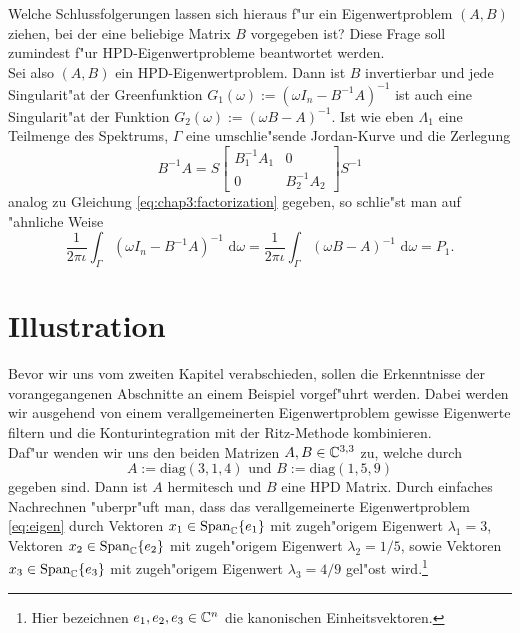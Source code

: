 Welche Schlussfolgerungen lassen sich hieraus f"ur ein Eigenwertproblem $(A,B)$ ziehen, bei der eine beliebige Matrix $B$ vorgegeben ist? Diese Frage soll zumindest f"ur HPD-Eigenwertprobleme beantwortet werden.\\

Sei also $(A,B)$ ein HPD-Eigenwertproblem. Dann ist $B$ invertierbar und jede Singularit"at der Greenfunktion $G_1(\omega) := (\omega I_n - B^{-1}A)^{-1}$
ist auch eine Singularit"at der Funktion $G_2(\omega):=(\omega B - A)^{-1}$. Ist wie eben $\Lambda_1$ eine Teilmenge des Spektrums, $\Gamma$ eine umschlie"sende Jordan-Kurve und die Zerlegung
\[
B^{-1}A = S\begin{bmatrix} B^{-1}_1 A_1 & 0 \\ 0 & B^{-1}_2 A_2 \end{bmatrix} S^{-1}
\]
analog zu Gleichung \ref{eq:chap3:factorization} gegeben, so schlie"st man auf "ahnliche Weise
\[
\frac{1}{2\pi\iota}\int_\Gamma (\omega I_n - B^{-1}A)^{-1} \text{ d}\omega =
\frac{1}{2\pi\iota}\int_\Gamma (\omega B - A)^{-1} \text{ d}\omega
= P_1.
\]

\section{Illustration}\label{sec:bsp}

Bevor wir uns vom zweiten Kapitel verabschieden, sollen die Erkenntnisse der vorangegangenen
Abschnitte an einem Beispiel vorgef"uhrt werden. Dabei werden wir ausgehend von einem
verallgemeinerten Eigenwertproblem gewisse Eigenwerte filtern und die Konturintegration
mit der Ritz-Methode kombinieren.\\

Daf"ur wenden wir uns den beiden Matrizen
$A,B \in \mathbb{C}^{3,3}$ zu, welche durch
\[
A:= \text{diag}(3,1,4)\text{ und }
B:= \text{diag}(1,5,9)
\]
gegeben sind. Dann ist $A$ hermitesch und $B$ eine HPD Matrix.
Durch einfaches Nachrechnen "uberpr"uft man, dass das
verallgemeinerte Eigenwertproblem \eqref{eq:eigen} durch Vektoren
$x_1 \in \text{Span}_{\mathbb{C}}\{e_1\}$ mit zugeh"origem Eigenwert $\lambda_1 = 3$, Vektoren
$x_2 \in \text{Span}_{\mathbb{C}}\{e_2\}$ mit zugeh"origem Eigenwert $\lambda_2 = 1/5$, sowie
Vektoren $x_3 \in\text{Span}_{\mathbb{C}}\{e_3\}$ mit zugeh"origem Eigenwert $\lambda_3 = 4/9$
gel"ost wird.\footnote{Hier bezeichnen $e_1, e_2, e_3 \in\mathbb{C}^n$ die kanonischen Einheitsvektoren.}\\

